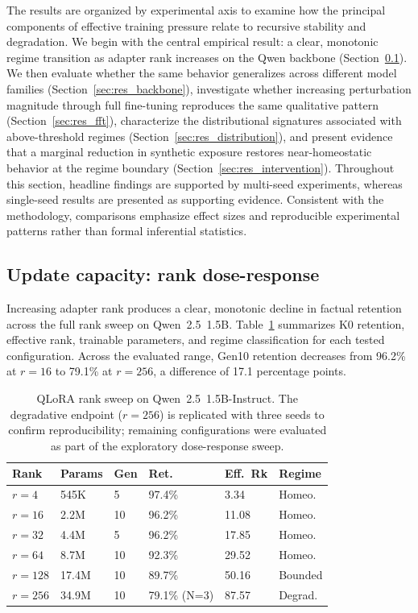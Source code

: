 \documentclass[a4paper,fleqn]{cas-dc}
\begin{document}
The results are organized by experimental axis to examine how the principal
components of effective training pressure relate to recursive stability and
degradation. We begin with the central empirical result: a clear, monotonic
regime transition as adapter rank increases on the Qwen backbone
(Section~\ref{sec:res_capacity}). We then evaluate whether the same behavior
generalizes across different model families (Section~\ref{sec:res_backbone}),
investigate whether increasing perturbation magnitude through full fine-tuning
reproduces the same qualitative pattern (Section~\ref{sec:res_fft}), characterize the
distributional signatures associated with above-threshold regimes
(Section~\ref{sec:res_distribution}), and present evidence that a marginal reduction
in synthetic exposure restores near-homeostatic behavior at the regime boundary
(Section~\ref{sec:res_intervention}). Throughout this section, headline findings are
supported by multi-seed experiments, whereas single-seed results are presented
as supporting evidence. Consistent with the methodology, comparisons emphasize
effect sizes and reproducible experimental patterns rather than formal
inferential statistics.

\subsection{Update capacity: rank dose-response}\label{sec:res_capacity}

Increasing adapter rank produces a clear, monotonic decline in factual retention
across the full rank sweep on Qwen~2.5~1.5B.
Table~\ref{tab:rank_sweep} summarizes K0 retention, effective rank, trainable
parameters, and regime classification for each tested configuration. Across the
evaluated range, Gen10 retention decreases from 96.2\% at $r=16$ to 79.1\% at
$r=256$, a difference of 17.1 percentage points.

\begin{table}[width=.95\linewidth,cols=6,pos=htbp]
\caption{QLoRA rank sweep on Qwen~2.5~1.5B-Instruct. The degradative endpoint
($r=256$) is replicated with three seeds to confirm reproducibility; remaining
configurations were evaluated as part of the exploratory dose-response
sweep.}\label{tab:rank_sweep}
\begin{tabular*}{\tblwidth}{@{}l@{\hskip 4pt}l@{\hskip 4pt}l@{\hskip 4pt}l@{\hskip 4pt}l@{\hskip 4pt}l@{}}
\toprule
Rank & Params & Gen & Ret. & Eff.\ Rk & Regime \\
\midrule
$r=4$   & 545K  & 5  & 97.4\%           & 3.34  & Homeo. \\
$r=16$  & 2.2M  & 10 & 96.2\%           & 11.08 & Homeo. \\
$r=32$  & 4.4M  & 5  & 96.2\%           & 17.85 & Homeo. \\
$r=64$  & 8.7M  & 10 & 92.3\%           & 29.52 & Homeo. \\
$r=128$ & 17.4M & 10 & 89.7\%           & 50.16 & Bounded \\
$r=256$ & 34.9M & 10 & 79.1\% (N=3)     & 87.57 & Degrad. \\
\bottomrule
\end{tabular*}
\end{table}
\end{document}
